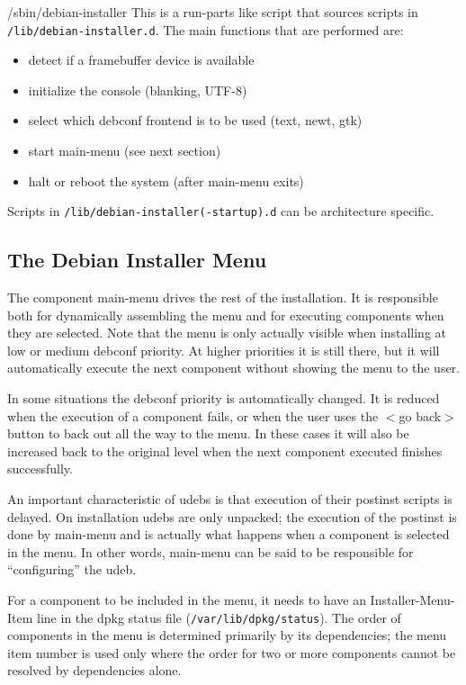 \documentclass[a4paper,10pt]{article}
\begin{document}
\begin{enumerate}
\begin{flushleft}
/sbin/debian-installer \linebreak
This is a run-parts like script that sources scripts in \texttt{/lib/debian-installer.d}. The main functions that are performed are:
  \end{flushleft}
  \begin{itemize}
\item detect if a framebuffer device is available
\item initialize the console (blanking, UTF-8)
\item select which debconf frontend is to be used (text, newt, gtk)
\item start main-menu (see next section)
\item halt or reboot the system (after main-menu exits)
  \end{itemize}
\end{enumerate}

Scripts in \texttt{/lib/debian-installer(-startup).d} can be architecture specific. 


\subsection{The Debian Installer Menu}
The component main-menu drives the rest of the installation. It is responsible both for dynamically assembling the menu and for executing components when they are selected. Note that the menu is only actually visible when installing at low or medium debconf priority. At higher priorities it is still there, but it will automatically execute the next component without showing the menu to the user. 

In some situations the debconf priority is automatically changed. It is reduced when the execution of a component fails, or when the user uses the $<$go back$>$ button to back out all the way to the menu. In these cases it will also be increased back to the original level when the next component executed finishes successfully. 

An important characteristic of udebs is that execution of their postinst scripts is delayed. On installation udebs are only unpacked; the execution of the postinst is done by main-menu and is actually what happens when a component is selected in the menu. In other words, main-menu can be said to be responsible for “configuring” the udeb. 

For a component to be included in the menu, it needs to have an Installer-Menu-Item line in the dpkg status file (\texttt{/var/lib/dpkg/status}). The order of components in the menu is determined primarily by its dependencies; the menu item number is used only where the order for two or more components cannot be resolved by dependencies alone. 
\end{document}
